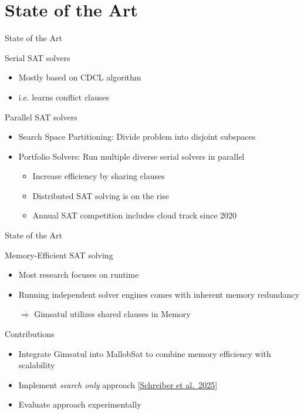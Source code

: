 \documentclass{beamer}
\begin{document}
\section{State of the Art}
\begin{frame}{State of the Art}
    \begin{block}{Serial SAT solvers}
        \begin{itemize}
            \item Mostly based on CDCL algorithm
            \item i.e. learns conflict clauses
        \end{itemize}
    \end{block}

    \begin{block}{Parallel SAT solvers}
        \begin{itemize}
            \item Search Space Partitioning: Divide problem into disjoint subspaces
            \item Portfolio Solvers: Run multiple diverse serial solvers in parallel
            \begin{itemize}
                \item Increase efficiency by sharing clauses
                \item Distributed SAT solving is on the rise
                \item Annual SAT competition includes cloud track since 2020
            \end{itemize}
        \end{itemize}
    \end{block}
\end{frame}

\begin{frame}{State of the Art}
    \begin{block}{Memory-Efficient SAT solving}
        \begin{itemize}
            \item Most research focuses on runtime
            \item Running independent solver engines comes with inherent memory redundancy
            \item[$\Rightarrow$] Gimsatul utilizes shared clauses in Memory
        \end{itemize}
    \end{block}

    \begin{block}{Contributions}
        \begin{itemize}
            \item Integrate Gimsatul into MallobSat to combine memory efficiency with scalability
            \item Implement \textit{search only} approach [\href{https://satres.kikit.kit.edu/papers/2025-sat-streamlining-pre.pdf}{Schreiber et al.~2025}]
            \item Evaluate approach experimentally
        \end{itemize}
    \end{block}
\end{frame}
\end{document}
